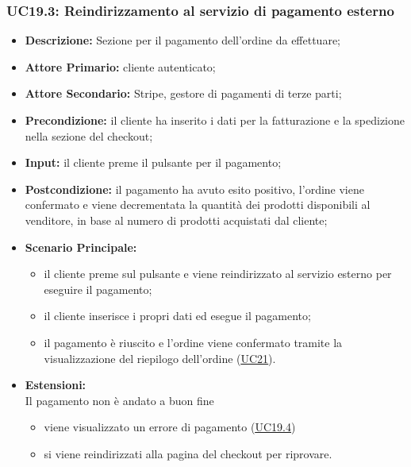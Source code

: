 \subsubsection{UC19.3: Reindirizzamento al servizio di pagamento esterno}
\label{sec:UC19.3}
\begin{itemize}
    \item \textbf{Descrizione:} Sezione per il pagamento dell'ordine da effettuare;
    \item \textbf{Attore Primario:} cliente autenticato;
    \item \textbf{Attore Secondario:} Stripe, gestore di pagamenti di terze parti;
    \item \textbf{Precondizione:} il cliente ha inserito i dati per la fatturazione e la spedizione nella sezione del checkout;
    \item \textbf{Input:} il cliente preme il pulsante per il pagamento;
    \item \textbf{Postcondizione:} il pagamento ha avuto esito positivo, l'ordine viene confermato e viene decrementata la quantità dei prodotti disponibili al venditore, in base al numero di prodotti acquistati dal cliente;
    \item \textbf{Scenario Principale:}
          \begin{itemize}
              \item il cliente preme sul pulsante e viene reindirizzato al servizio esterno per eseguire il pagamento;
              \item il cliente inserisce i propri dati ed esegue il pagamento;
              \item il pagamento è riuscito e l'ordine viene confermato tramite la visualizzazione del riepilogo dell'ordine (\hyperref[sec:UC21]{\underline{UC21}}).
          \end{itemize}
    \item \textbf{Estensioni:}\\
          Il pagamento non è andato a buon fine
          \begin{itemize}
              \item viene visualizzato un errore di pagamento (\hyperref[sec:UC19.4]{\underline{UC19.4}})
              \item si viene reindirizzati alla pagina del checkout per riprovare.
          \end{itemize}
\end{itemize}

